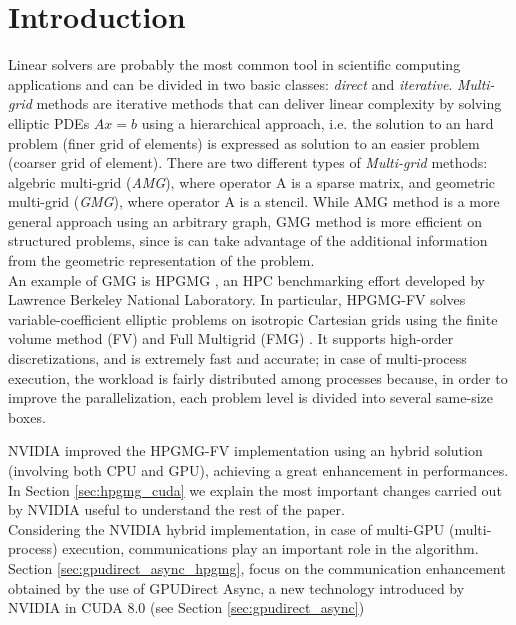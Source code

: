 \documentclass[conference]{IEEEtran}
\begin{document}
\section{Introduction}\label{sec:introduction}
Linear solvers are probably the most common tool in scientific computing applications and can be divided in two basic classes: \emph{direct} and \emph{iterative}.
\emph{Multi-grid} methods are iterative methods that can deliver linear complexity by solving elliptic PDEs $Ax=b$ using a hierarchical approach, i.e. the solution to an hard problem (finer grid of elements) is expressed as solution to an easier problem (coarser grid of element).
There are two different types of \emph{Multi-grid} methods: algebric multi-grid (\emph{AMG}), where operator A is a sparse matrix, and geometric multi-grid (\emph{GMG}), where operator A is a stencil. While AMG method is a more general approach using an arbitrary graph, GMG method is more efficient on structured problems, since is can take advantage of the additional information from the geometric representation of the problem.\\

An example of GMG is HPGMG \cite{HPGMG}, an HPC benchmarking effort developed by Lawrence Berkeley National Laboratory. In particular, HPGMG-FV solves variable-coefficient elliptic problems on isotropic Cartesian grids using the finite volume method (FV) \cite{finitevolume} and Full Multigrid (FMG) \cite{fullmultigrid}. It supports high-order discretizations, and is extremely fast and accurate; in case of multi-process execution, the workload is fairly distributed among processes because, in order to improve the parallelization, each problem level is divided into several same-size boxes.

NVIDIA improved the HPGMG-FV implementation \cite{HPGMG_NVIDIA} using an hybrid solution (involving both CPU and GPU), achieving a great enhancement in performances. In Section \ref{sec:hpgmg_cuda} we explain the most important changes carried out by NVIDIA useful to understand the rest of the paper.\\

Considering the NVIDIA hybrid implementation, in case of multi-GPU (multi-process) execution, communications play an important role in the algorithm. Section \ref{sec:gpudirect_async_hpgmg}, focus on the communication enhancement obtained by the use of GPUDirect Async, a new technology introduced by NVIDIA in CUDA 8.0 (see Section \ref{sec:gpudirect_async})
\end{document}
